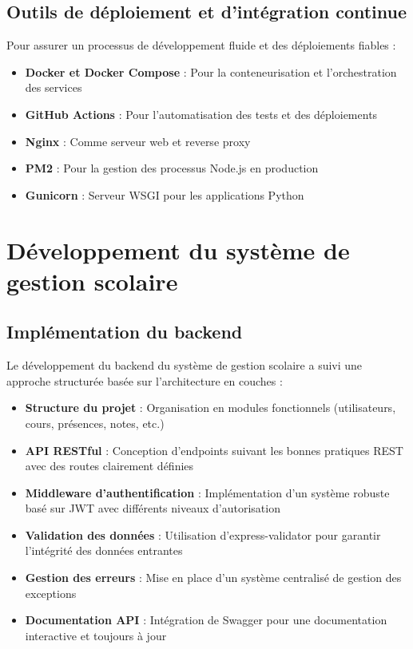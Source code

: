 \subsection{Outils de déploiement et d'intégration continue}

Pour assurer un processus de développement fluide et des déploiements fiables :

\begin{itemize}
  \item \textbf{Docker et Docker Compose} : Pour la conteneurisation et l'orchestration des services
  
  \item \textbf{GitHub Actions} : Pour l'automatisation des tests et des déploiements
  
  \item \textbf{Nginx} : Comme serveur web et reverse proxy
  
  \item \textbf{PM2} : Pour la gestion des processus Node.js en production
  
  \item \textbf{Gunicorn} : Serveur WSGI pour les applications Python
\end{itemize}

\section{Développement du système de gestion scolaire}

\subsection{Implémentation du backend}
Le développement du backend du système de gestion scolaire a suivi une approche structurée basée sur l'architecture en couches :

\begin{itemize}
  \item \textbf{Structure du projet} : Organisation en modules fonctionnels (utilisateurs, cours, présences, notes, etc.)
  
  \item \textbf{API RESTful} : Conception d'endpoints suivant les bonnes pratiques REST avec des routes clairement définies
  
  \item \textbf{Middleware d'authentification} : Implémentation d'un système robuste basé sur JWT avec différents niveaux d'autorisation
  
  \item \textbf{Validation des données} : Utilisation d'express-validator pour garantir l'intégrité des données entrantes
  
  \item \textbf{Gestion des erreurs} : Mise en place d'un système centralisé de gestion des exceptions
  
  \item \textbf{Documentation API} : Intégration de Swagger pour une documentation interactive et toujours à jour
\end{itemize}

